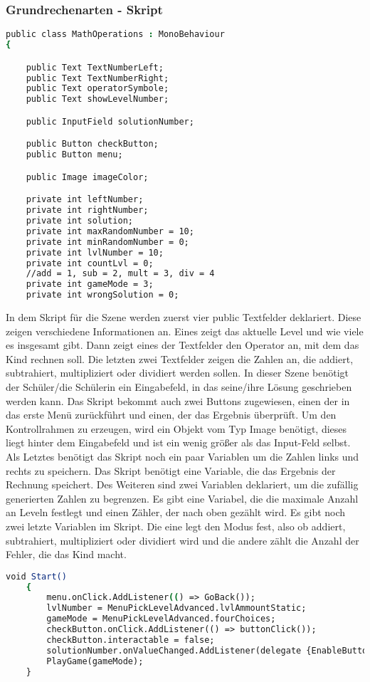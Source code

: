 \subsubsection{Grundrechenarten - Skript}
\begin{lstlisting}[language=csh, caption={MathOperations.cs Variablen-Deklaration}]
public class MathOperations : MonoBehaviour
{

	public Text TextNumberLeft;
	public Text TextNumberRight;
	public Text operatorSymbole;
	public Text showLevelNumber;

	public InputField solutionNumber;

	public Button checkButton;
	public Button menu;

	public Image imageColor;

	private int leftNumber;
	private int rightNumber;
	private int solution;
	private int maxRandomNumber = 10;
	private int minRandomNumber = 0;
	private int lvlNumber = 10;
	private int countLvl = 0;
	//add = 1, sub = 2, mult = 3, div = 4
	private int gameMode = 3;
	private int wrongSolution = 0;
\end{lstlisting}
In dem Skript für die Szene werden zuerst vier public Textfelder deklariert. Diese zeigen verschiedene Informationen an. Eines zeigt das aktuelle Level und wie viele es insgesamt gibt. Dann zeigt eines der Textfelder den Operator an, mit dem das Kind rechnen soll. Die letzten zwei Textfelder zeigen die Zahlen an, die addiert, subtrahiert, multipliziert oder dividiert werden sollen. In dieser Szene benötigt der Schüler/die Schülerin ein Eingabefeld, in das seine/ihre Lösung geschrieben werden kann. Das Skript bekommt auch zwei Buttons zugewiesen, einen der in das erste Menü zurückführt und einen, der das Ergebnis überprüft. Um den Kontrollrahmen zu erzeugen, wird ein Objekt vom Typ Image benötigt, dieses liegt hinter dem Eingabefeld und ist ein wenig größer als das Input-Feld selbst. Als Letztes benötigt das Skript noch ein paar Variablen um die Zahlen links und rechts zu speichern. Das Skript benötigt eine Variable, die das Ergebnis der Rechnung speichert. Des Weiteren sind zwei Variablen deklariert, um die zufällig generierten Zahlen zu begrenzen. Es gibt eine Variabel, die die maximale Anzahl an Leveln festlegt und einen Zähler, der nach oben gezählt wird. Es gibt noch zwei letzte Variablen im Skript. Die eine legt den Modus fest, also ob addiert, subtrahiert, multipliziert oder dividiert wird und die andere zählt die Anzahl der Fehler, die das Kind macht.\\
\begin{lstlisting}[language=csh, caption={MathOperations.cs Start-Funktion}]
	void Start()
	{
		menu.onClick.AddListener(() => GoBack());
		lvlNumber = MenuPickLevelAdvanced.lvlAmmountStatic;
		gameMode = MenuPickLevelAdvanced.fourChoices;
		checkButton.onClick.AddListener(() => buttonClick());
		checkButton.interactable = false;
		solutionNumber.onValueChanged.AddListener(delegate {EnableButton(); });
		PlayGame(gameMode);
	}
\end{lstlisting}
